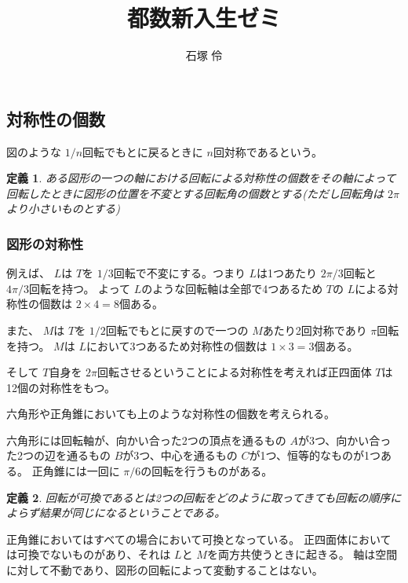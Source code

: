 \documentclass[dvipdfmx]{jsarticle}
\title{都数新入生ゼミ}
\author{石塚 伶}
\date{}
\newtheorem{defi}{定義}
\begin{document}
\maketitle

\newtheorem{theo}{定理}
\newtheorem{defi}{定義}
\newtheorem{lemm}{補題}
\newtheorem{plob}{演習問題}

\subsection{対称性の個数}

図のような $1/n$回転でもとに戻るときに $n$回対称であるという。

\begin{defi}
ある図形の一つの軸における回転による対称性の個数をその軸によって回転したときに図形の位置を不変とする回転角の個数とする(ただし回転角は $2\pi$より小さいものとする)
\end{defi}

\subsubsection{図形の対称性}

例えば、 $L$は $T$を $1/3$回転で不変にする。つまり $L$は1つあたり $2\pi /3$回転と $4\pi /3$回転を持つ。
よって $L$のような回転軸は全部で4つあるため $T$の $L$による対称性の個数は $2 \times 4 = 8$個ある。

また、 $M$は $T$を $1/2$回転でもとに戻すので一つの $M$あたり2回対称であり $\pi$回転を持つ。 $M$は $L$において3つあるため対称性の個数は $1 \times 3 = 3$個ある。

そして $T$自身を $2\pi$回転させるということによる対称性を考えれば正四面体 $T$は12個の対称性をもつ。


六角形や正角錐においても上のような対称性の個数を考えられる。

六角形には回転軸が、向かい合った2つの頂点を通るもの $A$が3つ、向かい合った2つの辺を通るもの $B$が3つ、中心を通るもの $C$が1つ、恒等的なものが1つある。
正角錐には一回に $\pi /6$の回転を行うものがある。

\begin{defi}
回転が可換であるとは2つの回転をどのように取ってきても回転の順序によらず結果が同じになるということである。
\end{defi}

正角錐においてはすべての場合において可換となっている。
正四面体においては可換でないものがあり、それは $L$と $M$を両方共使うときに起きる。
軸は空間に対して不動であり、図形の回転によって変動することはない。
\end{document}
